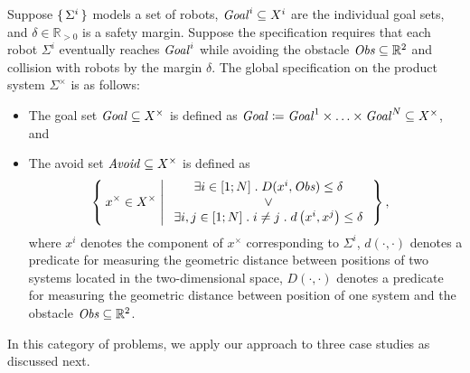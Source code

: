 Suppose $\set{\Sigma^i}$ 
models a set of robots, 
$\mathit{Goal}^i\subseteq X^i$ are the individual goal sets, and $\delta \in \mathbb{R}_{>0}$ is a safety margin. 
Suppose the specification requires that each robot $\Sigma^i$ eventually reaches $\mathit{Goal}^i$ 
while avoiding the obstacle $\mathit{Obs}\subseteq \mathbb{R}^2$ and collision with robots by the margin $\delta$.
The global specification on the product system $\Sigma^\times$ 
is as follows:
\begin{itemize}
	\item The goal set $\mathit{Goal}\subseteq X^\times$ is defined as $\mathit{Goal} \coloneqq \mathit{Goal}^1\times \ldots \times \mathit{Goal}^N \subseteq X^\times$, and
	\item The avoid set $\mathit{Avoid}\subseteq X^\times$ is defined as 
		\begin{align}
				&\Set{ x^\times\in X^\times | 
					\begin{array}{c}
						\exists i\in [1;N]\;.\; D(x^i,\mathit{Obs}) \leq \delta\\
						\vee\\
						 \exists i,j\in [1;N]\;.\;i\neq j\;.\;d\left(x^i,x^j\right)\leq\delta
					\end{array}},
		\end{align}
	where $x^i$ denotes the component of $x^\times$ corresponding to $\Sigma^i$, $d(\cdot,\cdot)$ denotes a predicate for measuring the geometric distance between positions of two systems located in the two-dimensional space, $D(\cdot,\cdot)$ denotes a predicate for measuring the geometric distance between position of one system and the obstacle $\mathit{Obs}\subseteq \mathbb{R}^2$.
\end{itemize}
%
%
In this category of problems, we apply our approach to three case studies as discussed next.

